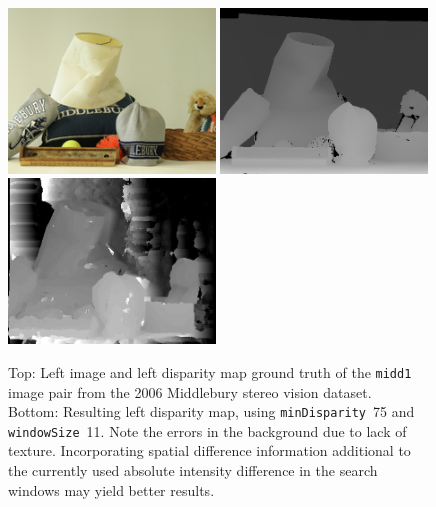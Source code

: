\documentclass[english, paper=a4]{scrartcl}
\begin{document}
\begin{figure}[H]
\centering
\includegraphics[width=0.49\textwidth]{midd1_left.png}
\label{fig:midd1_left}
\includegraphics[width=0.49\textwidth]{midd1_groundtruth_left.png}
\label{fig:midd1_groundtruth_left}
\includegraphics[width=0.49\textwidth]{midd1_result_left_winsize11_mindisp75.png}
\label{fig:midd1_result_left_winsize11_mindisp75}
\caption{Top: Left image and left disparity map ground truth of the \texttt{midd1} image pair from the 2006 Middlebury stereo vision dataset.\\
Bottom: Resulting left disparity map, using \texttt{minDisparity}~75 and \texttt{windowSize}~11. Note the errors in the background due to lack of texture. Incorporating spatial difference information additional to the currently used absolute intensity difference in the search windows may yield better results.}
\end{figure}


\newpage



\end{document}
